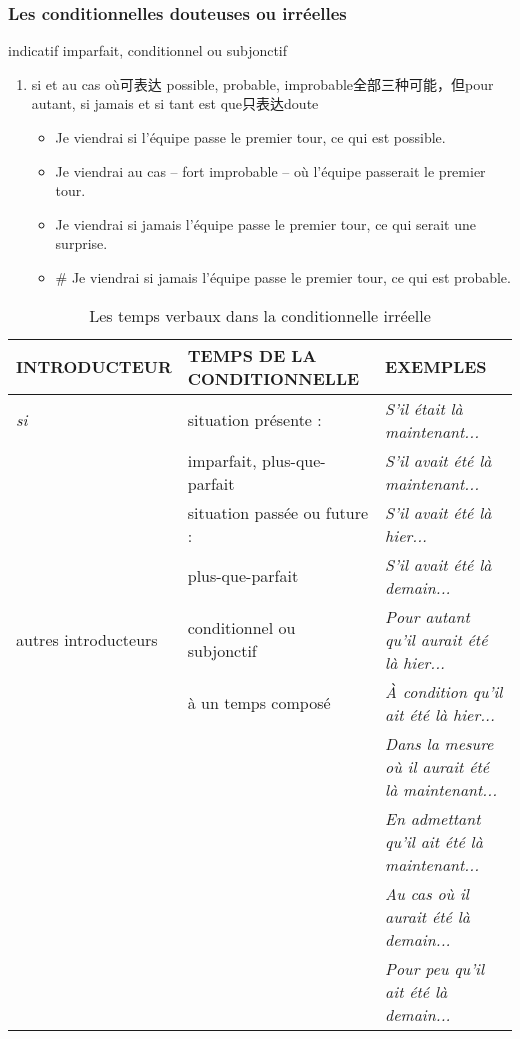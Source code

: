 \documentclass[UTF8]{report}
\begin{document}
\subsubsection{Les conditionnelles douteuses ou irréelles}
indicatif imparfait, conditionnel ou subjonctif
\begin{enumerate}
    \item si et au cas où可表达 possible, probable, improbable全部三种可能，但pour autant, si jamais et si tant est que只表达doute
    \begin{itemize}
        \item Je viendrai si l’équipe passe le premier tour, ce qui est possible.
        \item Je viendrai au cas – fort improbable – où l’équipe passerait le premier tour.
        \item Je viendrai si jamais l’équipe passe le premier tour, ce qui serait une surprise.
        \item \# Je viendrai si jamais l’équipe passe le premier tour, ce qui est probable.
    \end{itemize}
\end{enumerate}
\begin{table}[H]
    \centering 
    \small
    \begin{tabular}{|l|l|l|}
    \hline
    \rowcolor{cyan!20}
    \textbf{INTRODUCTEUR} & \textbf{TEMPS DE LA CONDITIONNELLE} & \textbf{EXEMPLES} \\
    \hline
    \textit{si} & situation présente : & \textit{S'il était là maintenant...} \\
    & imparfait, plus-que-parfait & \textit{S'il avait été là maintenant...} \\
    \cline{2-3}
    & situation passée ou future : & \textit{S'il avait été là hier...} \\
    & plus-que-parfait & \textit{S'il avait été là demain...} \\
    \hline
    autres introducteurs & conditionnel ou subjonctif & \textit{Pour autant qu'il aurait été là hier...} \\
    & à un temps composé & \textit{À condition qu'il ait été là hier...} \\
    & & \textit{Dans la mesure où il aurait été là maintenant...} \\
    & & \textit{En admettant qu'il ait été là maintenant...} \\
    & & \textit{Au cas où il aurait été là demain...} \\
    & & \textit{Pour peu qu'il ait été là demain...} \\
    \hline
    \end{tabular}
    \caption{Les temps verbaux dans la conditionnelle irréelle}
\end{table}
\end{document}
